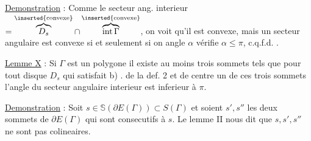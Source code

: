 \uline{Demonstration} : Comme le secteur ang. interieur $=\overbrace{D_s}^{\inserted{\text{convexe}}}\cap\overbrace{\operatorname{int}\Gamma}^{\inserted{\text{convexe}}}$, on voit qu'il est convexe, mais un secteur angulaire est convexe si et seulement si on angle $\alpha$ vérifie $\alpha\le\pi$, c.q.f.d. .


\uline{Lemme X} : Si $\Gamma$ est un polygone il existe au moins trois sommets tels que pour tout disque $D_s$ qui satisfait b) . de la def. 2 et de centre un de ces trois sommets l'angle du secteur angulaire interieur est inferieur à $\pi$.

\uline{Demonstration} : Soit $s\in\mathbb{S}(\partial E(\Gamma))\subset S(\Gamma)$ et soient $s',s''$ les deux sommets de $\partial E(\Gamma)$ qui sont consecutifs à $s$. Le lemme II nous dit que $s,s',s''$ ne sont pas colineaires.
